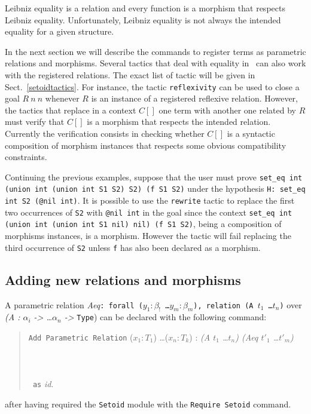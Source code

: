 Leibniz equality is a relation and every function is a
morphism that respects Leibniz equality. Unfortunately, Leibniz equality
is not always the intended equality for a given structure.

In the next section we will describe the commands to register terms as
parametric relations and morphisms. Several tactics that deal with equality
in \Coq\ can also work with the registered relations.
The exact list of tactic will be given in Sect.~\ref{setoidtactics}.
For instance, the
tactic \texttt{reflexivity} can be used to close a goal $R~n~n$ whenever
$R$ is an instance of a registered reflexive relation. However, the tactics
that replace in a context $C[]$ one term with another one related by $R$
must verify that $C[]$ is a morphism that respects the intended relation.
Currently the verification consists in checking whether $C[]$ is a syntactic
composition of morphism instances that respects some obvious
compatibility constraints.

\begin{cscexample}[Rewriting]
Continuing the previous examples, suppose that the user must prove
\texttt{set\_eq int (union int (union int S1 S2) S2) (f S1 S2)} under the
hypothesis \texttt{H: set\_eq int S2 (@nil int)}. It is possible to
use the \texttt{rewrite} tactic to replace the first two occurrences of
\texttt{S2} with \texttt{@nil int} in the goal since the context
\texttt{set\_eq int (union int (union int S1 nil) nil) (f S1 S2)}, being
a composition of morphisms instances, is a morphism. However the tactic
will fail replacing the third occurrence of \texttt{S2} unless \texttt{f}
has also been declared as a morphism.
\end{cscexample}

\subsection{Adding new relations and morphisms}
A parametric relation
\textit{Aeq}\texttt{: forall ($y_1 : \beta_!$ \ldots $y_m : \beta_m$), relation (A $t_1$ \ldots $t_n$)} over
\textit{(A : $\alpha_i$ -> \ldots $\alpha_n$ -> }\texttt{Type})
can be declared with the following command:

\begin{quote}
  \texttt{Add Parametric Relation} ($x_1 : T_1$) \ldots ($x_n : T_k$) :
  \textit{(A $t_1$ \ldots $t_n$) (Aeq $t'_1$ \ldots $t'_m$)}\\
  ~\\
  ~\\
  ~\\
  \texttt{~as} \textit{id}.
\end{quote}
after having required the \texttt{Setoid} module with the
\texttt{Require Setoid} command.

